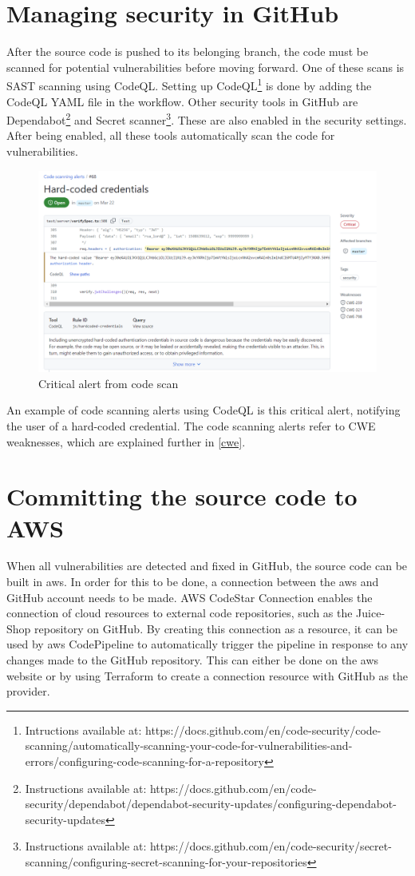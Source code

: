\section{Managing security in GitHub}
After the source code is pushed to its belonging branch, the code must be scanned for potential vulnerabilities before moving forward. One of these scans is SAST scanning using CodeQL. Setting up CodeQL\footnote{Intructions available at: https://docs.github.com/en/code-security/code-scanning/automatically-scanning-your-code-for-vulnerabilities-and-errors/configuring-code-scanning-for-a-repository} is done by adding the CodeQL YAML file in the workflow. Other security tools in GitHub are Dependabot\footnote{Instructions available at: https://docs.github.com/en/code-security/dependabot/dependabot-security-updates/configuring-dependabot-security-updates} and Secret scanner\footnote{Instructions available at: https://docs.github.com/en/code-security/secret-scanning/configuring-secret-scanning-for-your-repositories}. These are also enabled in the security settings. After being enabled, all these tools automatically scan the code for vulnerabilities.

\begin{figure}[H]
    \centering
    \includegraphics[width=0.8\columnwidth]{Images/codescan.png}
    \caption{Critical alert from code scan}
    \label{fig: Critical alert from code scan}
\end{figure}

An example of code scanning alerts using CodeQL is this critical alert, notifying the user of a hard-coded credential. The code scanning alerts refer to CWE weaknesses, which are explained further in \ref{cwe}.

\section{Committing the source code to AWS}
When all vulnerabilities are detected and fixed in GitHub, the source code can be built in \acrshort{aws}. In order for this to be done, a connection between the \acrshort{aws} and GitHub account needs to be made. AWS CodeStar Connection enables the connection of cloud resources to external code repositories, such as the Juice-Shop repository on GitHub. By creating this connection as a resource, it can be used by \acrshort{aws} CodePipeline to automatically trigger the pipeline in response to any changes made to the GitHub repository.
This can either be done on the \acrshort{aws} website or by using Terraform to create a connection resource with GitHub as the provider. 

